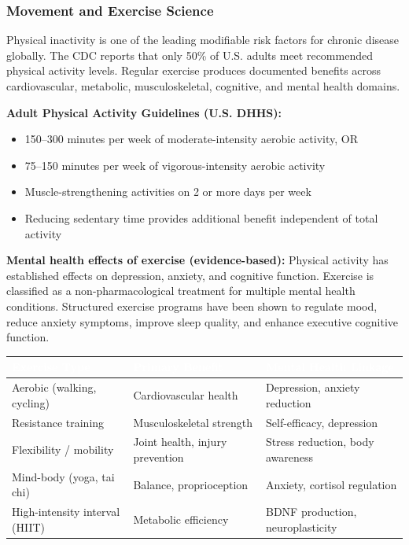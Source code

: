 \documentclass[11pt,letterpaper]{article}
\newcommand{\tableheader}[1]{\textbf{\sffamily\textcolor{white}{#1}}}
\begin{document}
\subsubsection{Movement and Exercise Science}

Physical inactivity is one of the leading modifiable risk factors for chronic disease globally. The CDC reports that only 50\% of U.S. adults meet recommended physical activity levels. Regular exercise produces documented benefits across cardiovascular, metabolic, musculoskeletal, cognitive, and mental health domains.

\textbf{Adult Physical Activity Guidelines (U.S. DHHS):}
\begin{itemize}[leftmargin=1.5em]
  \item 150--300 minutes per week of moderate-intensity aerobic activity, OR
  \item 75--150 minutes per week of vigorous-intensity aerobic activity
  \item Muscle-strengthening activities on 2 or more days per week
  \item Reducing sedentary time provides additional benefit independent of total activity
\end{itemize}

\textbf{Mental health effects of exercise (evidence-based):}
Physical activity has established effects on depression, anxiety, and cognitive function. Exercise is classified as a non-pharmacological treatment for multiple mental health conditions. Structured exercise programs have been shown to regulate mood, reduce anxiety symptoms, improve sleep quality, and enhance executive cognitive function.

\begin{center}
\begin{tabularx}{\textwidth}{L{3.5cm}L{3.5cm}X}
\toprule
{}
\tableheader{Exercise Type} & \tableheader{Primary Benefit} & \tableheader{Mental Health Linkage} \\
\midrule
Aerobic (walking, cycling) & Cardiovascular health & Depression, anxiety reduction \\
Resistance training & Musculoskeletal strength & Self-efficacy, depression \\
Flexibility / mobility & Joint health, injury prevention & Stress reduction, body awareness \\
Mind-body (yoga, tai chi) & Balance, proprioception & Anxiety, cortisol regulation \\
High-intensity interval (HIIT) & Metabolic efficiency & BDNF production, neuroplasticity \\
\bottomrule
\end{tabularx}
\end{center}
\end{document}
